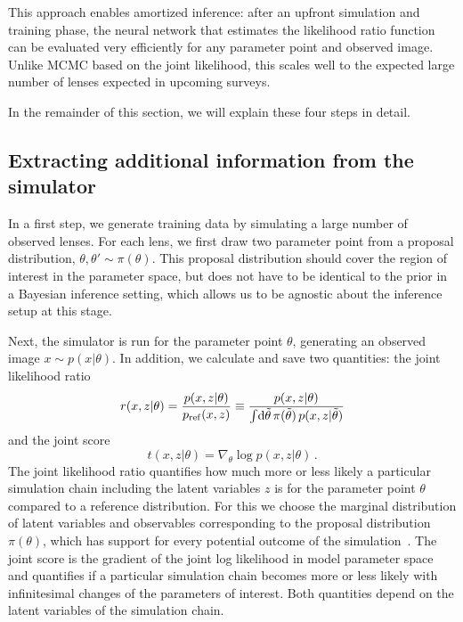 \documentclass[twocolumn]{aastex62}
\begin{document}
This approach enables amortized inference: after an upfront simulation and training phase, the neural network that estimates the likelihood ratio function can be evaluated very efficiently for any parameter point and observed image. Unlike MCMC based on the joint likelihood, this scales well to the expected large number of lenses expected in upcoming surveys.

In the remainder of this section, we will explain these four steps in detail.


\subsection{Extracting additional information from the simulator}
\label{sec:lfi-gold}

In a first step, we generate training data by simulating a large number of observed lenses. For each lens, we first draw two parameter point from a proposal distribution, $\theta, \theta' \sim \pi(\theta)$. This proposal distribution should cover the region of interest in the parameter space, but does not have to be identical to the prior in a Bayesian inference setting, which allows us to be agnostic about the inference setup at this stage.

Next, the simulator is run for the parameter point $\theta$, generating an observed image $x \sim p(x|\theta)$. In addition, we calculate and save two quantities: the joint likelihood ratio
%
\begin{equation}
  r(x,z | \theta) = \frac {p(x,z | \theta)} {p_\mathrm{ref}(x,z)}
  \equiv \frac {p(x,z | \theta)} {\int\!\diff\tilde{\theta} \, \pi(\tilde{\theta}) \, p(x,z | \tilde{\theta}) }
\end{equation}
%
and the joint score
%
\begin{equation}
  t(x, z | \theta) = \nabla_{\theta} \log p(x,z | \theta) \,.
\end{equation}
%
The joint likelihood ratio quantifies how much more or less likely a particular simulation chain including the latent variables $z$ is for the parameter point $\theta$ compared to a reference distribution. For this we choose the marginal distribution of latent variables and observables corresponding to the proposal distribution $\pi(\theta)$, which has support for every potential outcome of the simulation~\citep{Hermans:2019ioj}. The joint score is the gradient of the joint log likelihood in model parameter space and quantifies if a particular simulation chain becomes more or less likely with infinitesimal changes of the parameters of interest. Both quantities depend on the latent variables of the simulation chain.
\end{document}
